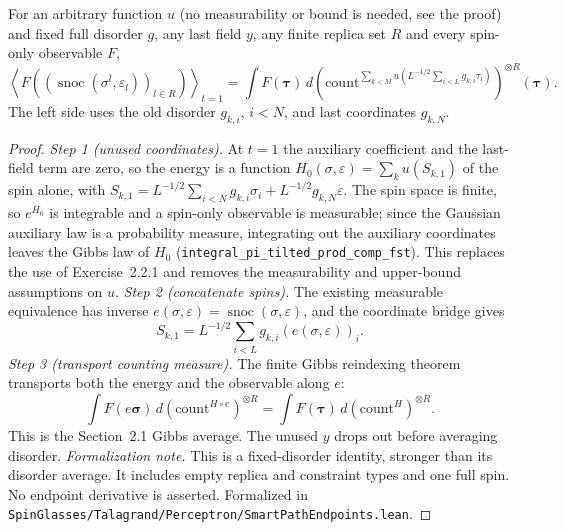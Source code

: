 \begin{theorem}\label{thm:sg-tal:perceptron-path-one}
  \leanok
For an arbitrary function $u$ (no measurability or bound is needed, see the proof) and fixed full disorder $g$, any last field $y$,
any finite replica set $R$ and every spin-only observable $F$,
\[
 \left\langle F\left((\operatorname{snoc}(\sigma^l,\varepsilon_l))_{l\in R}\right)\right\rangle_{t=1}
 =\int F(\boldsymbol\tau)\,d\left(\mathrm{count}^{\sum_{k<M}
 u(L^{-1/2}\sum_{i<L}g_{k,i}\tau_i)}\right)^{\otimes R}(\boldsymbol\tau).
\]
The left side uses the old disorder $g_{k,i}$, $i<N$, and last coordinates $g_{k,N}$.
\end{theorem}
\begin{proof}
  \leanok
\emph{Step 1 (unused coordinates).} At $t=1$ the auxiliary coefficient and the last-field term
are zero, so the energy is a function $H_0(\sigma,\varepsilon)=\sum_ku(S_{k,1})$ of the spin alone, with
$S_{k,1}=L^{-1/2}\sum_{i<N}g_{k,i}\sigma_i+L^{-1/2}g_{k,N}\varepsilon$. The spin space is finite, so $e^{H_0}$ is
integrable and a spin-only observable is measurable; since the Gaussian auxiliary law is a probability measure,
integrating out the auxiliary coordinates leaves the Gibbs law of $H_0$
(\texttt{integral\_pi\_tilted\_prod\_comp\_fst}). This replaces the use of Exercise~2.2.1 and removes
the measurability and upper-bound assumptions on $u$.
\emph{Step 2 (concatenate spins).} The existing measurable equivalence has inverse
$e(\sigma,\varepsilon)=\operatorname{snoc}(\sigma,\varepsilon)$, and the coordinate bridge gives
\[
 S_{k,1}=L^{-1/2}\sum_{i<L}g_{k,i}(e(\sigma,\varepsilon))_i.
\]
\emph{Step 3 (transport counting measure).} The finite Gibbs reindexing theorem transports
both the energy and the observable along $e$:
\[
 \int F(e\boldsymbol\sigma)\,d(\mathrm{count}^{H\circ e})^{\otimes R}
 =\int F(\boldsymbol\tau)\,d(\mathrm{count}^{H})^{\otimes R}.
\]
This is the Section~2.1 Gibbs average. The unused $y$ drops out before averaging disorder.
\emph{Formalization note.} This is a fixed-disorder identity, stronger than its disorder average.
It includes empty replica and constraint types and one full spin. No endpoint derivative is asserted.
Formalized in \texttt{SpinGlasses/Talagrand/Perceptron/SmartPathEndpoints.lean}.
\end{proof}



